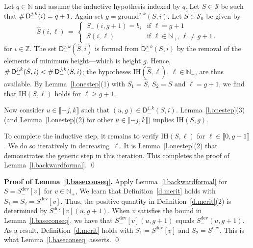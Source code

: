 \documentclass[letterpaper,11pt,oneside,reqno]{amsbook}
\newcommand{\N}{\ensuremath{\mathbb{N}}}
\newcommand{\Z}{\ensuremath{\mathbb{Z}}}
\numberwithin{figure}{chapter}
\theoremstyle{definition}
\theoremstyle{definition}
\theoremstyle{definition}
\theoremstyle{definition}
\theoremstyle{definition}
\newcommand{\mc}{\mathcal}
\newcommand{\nwithzero}{\N}
\newcommand{\nwithoutzero}{\N_+}
\newcommand{\tis}{\mc{S}_0}
\newcommand{\ground}{\textrm{ground}}
\newcommand{\indhyp}{\textrm{IH}}
\newcommand{\sdev}{S_-^{\textrm{dev}}}
\begin{document}
Let $q \in \nwithzero$ and assume the inductive hypothesis indexed by $q$. 
Let $S \in \mc{S}$ be such that  $\char"0023 \, \mathsf{D}_-^{j,k}(i) = q+1$. Again set $g =  \ground^{j,k}(S,i)$.
Let $\hat{S} \in \tis$ be given by
 $$
 \hat{S}(i,\ell) \, = \, \begin{cases}
  \, S_-(i,g+1) = b_i  &  \text{if $\ell = g+1$} \\
 \, S(i,\ell)  &  \text{if $\ell \in \nwithoutzero$, $\ell \not= g+1$} \, .
\end{cases}
$$
for $i \in \Z$. The set  $\mathsf{D}_-^{j,k}(\hat{S},i)$ is formed from
 $\mathsf{D}_-^{j,k}(S,i)$ by the removal of the elements of minimum height---which is height $g$.
Hence,  $\char"0023 \, \mathsf{D}_-^{j,k}(\hat{S},i) < \char"0023 \, \mathsf{D}_-^{j,k}(S,i)$; the hypotheses  $\indhyp(\hat{S},\ell)$, $\ell \in \nwithoutzero$, are thus available.
By Lemma~\ref{l.onestep}(1) with $S_1 = \hat{S}$, $S_2 = S$ and $\ell = g+1$, we find that $\indhyp(S,\ell)$ holds for $\ell \geq g+1$.

 Now consider  $u \in \llbracket -j,k \rrbracket$ such that $(u,g) \in \mathsf{D}_-^{j,k}(S,i)$. Lemma~\ref{l.onestep}(3) (and Lemma~\ref{l.onestep}(2) for other $u \in \llbracket -j,k \rrbracket$) implies $\indhyp(S,g)$.

To complete the inductive step, it remains to verify  $\indhyp(S,\ell)$ for $\ell \in \llbracket 0,g-1 \rrbracket$.
We do so iteratively in decreasing~$\ell$. It is Lemma~\ref{l.onestep}(2) that demonstrates the generic step in this iteration. This completes the proof of
 Lemma~\ref{l.backwardformal}. \qed

 {\bf Proof of Lemma~\ref{l.baseconseq}.} Apply  Lemma~\ref{l.backwardformal}  for $S = \sdev[v]$ for $v \in \nwithoutzero$,
We learn that Definition~\ref{d.merit} holds with $S_1 = S_2 = \sdev[v]$. Thus, the positive quantity in Definition~\ref{d.merit}(2) is determined by $\sdev[v](u,g+1)$. When $v$ satisfies the bound in Lemma~\ref{l.baseconseq}, we have that $\sdev[v](u,g+1)$ equals $\sdev(u,g+1)$. As a result, Definition~\ref{d.merit} holds with $S_1 = \sdev[v]$ and $S_2 = \sdev$. This is what Lemma~\ref{l.baseconseq} asserts. \qed
 
\end{document}
